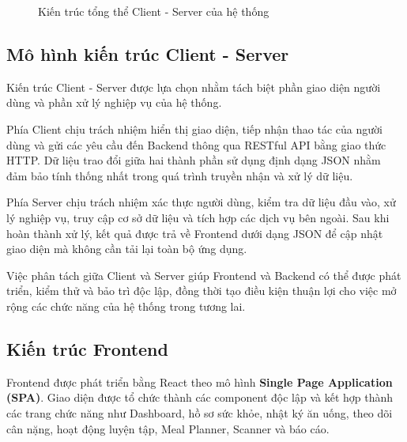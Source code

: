 \documentclass[12pt, a4paper]{report}
\begin{document}
\begin{figure}[htbp]
{
    }
    \caption{Kiến trúc tổng thể Client - Server của hệ thống}
    \label{fig:kientruc_tongthe}
\end{figure}

\subsection{Mô hình kiến trúc Client - Server}Kiến trúc Client - Server được lựa chọn nhằm tách biệt phần giao diện người dùng và phần xử lý nghiệp vụ của hệ thống.

Phía Client chịu trách nhiệm hiển thị giao diện, tiếp nhận thao tác của người dùng và gửi các yêu cầu đến Backend thông qua RESTful API bằng giao thức HTTP. Dữ liệu trao đổi giữa hai thành phần sử dụng định dạng JSON nhằm đảm bảo tính thống nhất trong quá trình truyền nhận và xử lý dữ liệu.

Phía Server chịu trách nhiệm xác thực người dùng, kiểm tra dữ liệu đầu vào, xử lý nghiệp vụ, truy cập cơ sở dữ liệu và tích hợp các dịch vụ bên ngoài. Sau khi hoàn thành xử lý, kết quả được trả về Frontend dưới dạng JSON để cập nhật giao diện mà không cần tải lại toàn bộ ứng dụng.

Việc phân tách giữa Client và Server giúp Frontend và Backend có thể được phát triển, kiểm thử và bảo trì độc lập, đồng thời tạo điều kiện thuận lợi cho việc mở rộng các chức năng của hệ thống trong tương lai.

\subsection{Kiến trúc Frontend}Frontend được phát triển bằng React theo mô hình \textbf{Single Page Application (SPA)}. Giao diện được tổ chức thành các component độc lập và kết hợp thành các trang chức năng như Dashboard, hồ sơ sức khỏe, nhật ký ăn uống, theo dõi cân nặng, hoạt động luyện tập, Meal Planner, Scanner và báo cáo.
\end{document}

